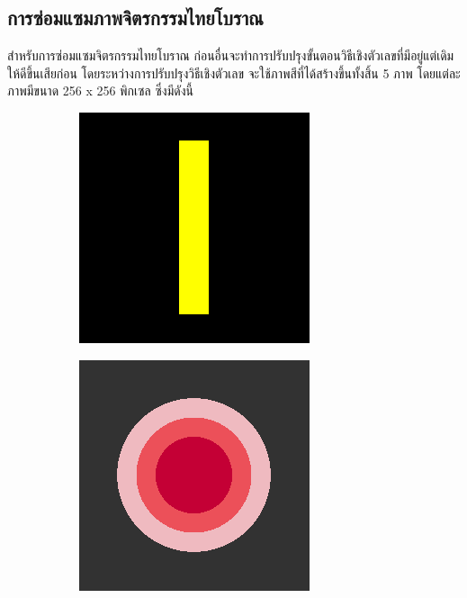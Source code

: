 \documentclass[hidelinks, a4paper,12pt]{article}
\numberwithin{equation}{section}							%
\numberwithin{equation}{section}
\begin{document}
{	\subsection{การซ่อมแซมภาพจิตรกรรมไทยโบราณ}
	\hspace{1cm} สำหรับการซ่อมแซมจิตรกรรมไทยโบราณ ก่อนอื่นจะทำการปรับปรุงขั้นตอนวิธีเชิงตัวเลขที่มีอยู่แต่เดิมให้ดีขึ้นเสียก่อน โดยระหว่างการปรับปรุงวิธีเชิงตัวเลข จะใช้ภาพสีที่ได้สร้างขึ้นทั้งสิ้น 5 ภาพ โดยแต่ละภาพมีขนาด 256 x 256 พิกเซล ซึ่งมีดังนี้
	\begin{figure}[H]
		\centering
		\begin{subfigure}{0.4\linewidth}
			\centering
			\includegraphics[width=0.8\linewidth]{images/image_inpaint_synthetic/case01-original.png}
		\end{subfigure}
		\begin{subfigure}{0.4\linewidth}
			\centering
			\includegraphics[width=0.8\linewidth]{images/image_inpaint_synthetic/case02-original.png}

\end{subfigure}
\end{figure}}
\end{document}
